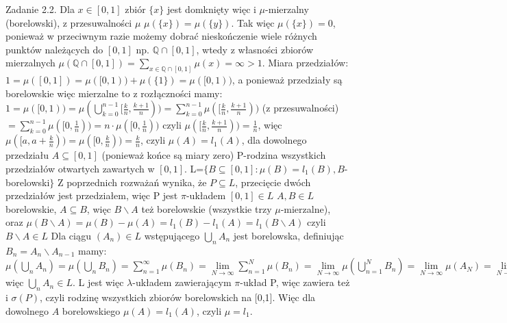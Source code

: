 \documentclass{article}
\begin{document}
Zadanie 2.2.
\newline
\newline
Dla $x\in[0,1]$ zbiór $\{x\}$ jest domknięty więc i $\mu$-mierzalny (borelowski), z przesuwalności $\mu$\newline
$\mu(\{x\})=\mu(\{y\})$. Tak więc $\mu(\{x\})=0$,\newline
ponieważ w przeciwnym razie możemy dobrać nieskończenie wiele różnych punktów należących do $[0,1]$ np. $\mathbb{Q}\cap[0,1]$, wtedy z własności zbiorów
mierzalnych $\mu(\mathbb{Q}\cap[0,1])=\sum\limits_{x\in\mathbb{Q}\cap[0,1]}\mu({x})=\infty>1$.\newline
Miara przedziałów:\newline
$1=\mu([0,1])=\mu([0,1))+\mu(\{1\})=\mu([0,1))$, a ponieważ przedziały są borelowskie więc mierzalne to z rozłączności mamy:\newline
$1=\mu([0,1))=\mu(\bigcup\limits_{k=0}^{n-1}[\frac{k}{n},\frac{k+1}{n}))=\sum\limits_{k=0}^{n-1}\mu([\frac{k}{n},\frac{k+1}{n}))$ (z przesuwalności)
$=\sum\limits_{k=0}^{n-1}\mu([0,\frac{1}{n}))=n\cdot\mu([0,\frac{1}{n}))$\newline
czyli $\mu([\frac{k}{n},\frac{k+1}{n}))=\frac{1}{n}$, więc $\mu([a,a+\frac{k}{n}))=\mu([0,\frac{k}{n}))=\frac{k}{n}$, czyli
$\mu(A)=l_1(A)$, dla dowolnego przedziału $A\subseteq[0,1]$ (ponieważ końce są miary zero)\newline\newline
P-rodzina wszystkich przedziałów otwartych zawartych w $[0,1]$.\newline
L=$\{B\subseteq[0,1]:\mu(B)=l_1(B),B$-borelowski$\}$\newline
Z poprzednich rozważań wynika, że $P\subseteq L$,\newline
przecięcie dwóch przedziałów jest przedziałem, więc P jest $\pi$-układem\newline
$[0,1]\in L$\newline
$A,B\in L$ borelowskie, $A\subseteq B$, więc $B\backslash A$ też borelowskie (wszystkie trzy $\mu$-mierzalne),\newline
oraz $\mu(B\backslash A)=\mu(B)-\mu(A)=l_1(B)-l_1(A)=l_1(B\backslash A)$ czyli $B\backslash A\in L$\newline
Dla ciągu $(A_n)\in L$ wstępującego $\bigcup\limits_{n}A_n$ jest borelowska, definiując $B_n=A_n\backslash A_{n-1}$ mamy:\newline
$\mu(\bigcup\limits_{n}A_n)=\mu(\bigcup\limits_{n}B_n)=\sum\limits_{n=1}^{\infty}\mu(B_n)=\lim\limits_{N\rightarrow\infty}\sum\limits_{n=1}^{N}\mu(B_n)=
\lim\limits_{N\rightarrow\infty}\mu(\bigcup\limits_{n=1}^{N}B_n)=\lim\limits_{N\rightarrow\infty}\mu(A_N)=\lim\limits_{N\rightarrow\infty}l_1(A_N)=l_1(\bigcup\limits_{n}A_n)$
więc $\bigcup\limits_{n}A_n\in L$.\newline
L jest więc $\lambda$-układem zawierającym $\pi$-układ P, więc zawiera też i $\sigma(P)$, czyli rodzinę wszystkich zbiorów borelowskich na [0,1].\newline
Więc dla dowolnego $A$ borelowskiego $\mu(A)=l_1(A)$, czyli $\mu=l_1$.\newpage
\end{document}
